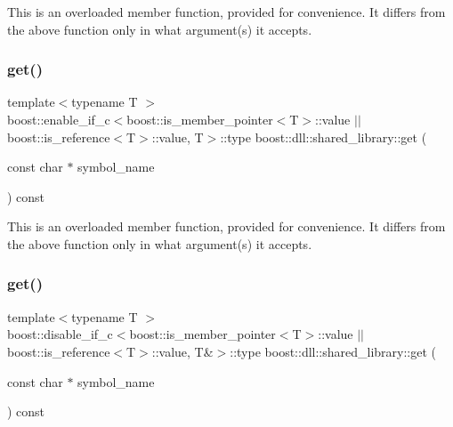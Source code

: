 This is an overloaded member function, provided for convenience. It differs from the above function only in what argument(s) it accepts. \mbox{\label{a01708_ab6b5d889534d4147149f865cad94b6ae}} 
\subsubsection{\texorpdfstring{get()}{get()}\hspace{0.1cm}{\footnotesize\ttfamily [3/4]}}
{\footnotesize\ttfamily template$<$typename T $>$ \\
boost\+::enable\+\_\+if\+\_\+c$<$boost\+::is\+\_\+member\+\_\+pointer$<$T$>$\+::value $\vert$$\vert$ boost\+::is\+\_\+reference$<$T$>$\+::value, T$>$\+::type boost\+::dll\+::shared\+\_\+library\+::get (\begin{DoxyParamCaption}\item[{const char $\ast$}]{symbol\+\_\+name }\end{DoxyParamCaption}) const\hspace{0.3cm}{\ttfamily [inline]}}

This is an overloaded member function, provided for convenience. It differs from the above function only in what argument(s) it accepts. \mbox{\label{a01708_af731064a5502f3ebd08e8dc0f1869747}} 
\subsubsection{\texorpdfstring{get()}{get()}\hspace{0.1cm}{\footnotesize\ttfamily [4/4]}}
{\footnotesize\ttfamily template$<$typename T $>$ \\
boost\+::disable\+\_\+if\+\_\+c$<$boost\+::is\+\_\+member\+\_\+pointer$<$T$>$\+::value $\vert$$\vert$ boost\+::is\+\_\+reference$<$T$>$\+::value, T\&$>$\+::type boost\+::dll\+::shared\+\_\+library\+::get (\begin{DoxyParamCaption}\item[{const char $\ast$}]{symbol\+\_\+name }\end{DoxyParamCaption}) const\hspace{0.3cm}{\ttfamily [inline]}}


